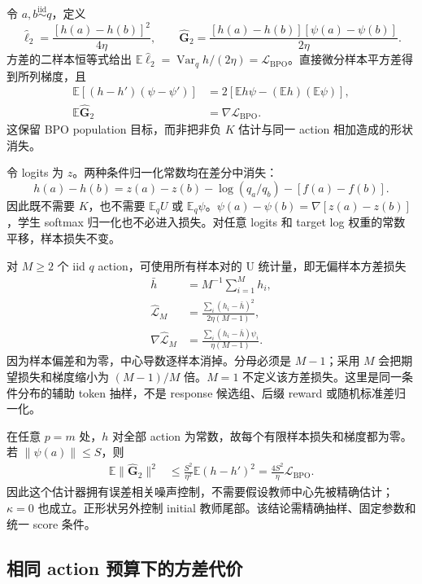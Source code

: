 \documentclass[lang=cn,scheme=chinese,openany]{../book/elegantbook}
\newcommand{\E}{\mathbb E}
\newcommand{\Var}{\operatorname{Var}}
\begin{document}
令 $a,b\overset{\mathrm{iid}}\sim q$，定义
\begin{equation}
 \widehat\ell_2=\frac{[h(a)-h(b)]^2}{4\eta},\qquad
 \widehat{\bm G}_2=\frac{[h(a)-h(b)][\psi(a)-\psi(b)]}{2\eta}.
 \label{eq:center-free-pair-bpo}
\end{equation}
方差的二样本恒等式给出 $\E\widehat\ell_2=\Var_qh/(2\eta)=\mathcal L_{\mathrm{BPO}}$。直接微分样本平方差得到所列梯度，且
\begin{align}
 \E[(h-h')(\psi-\psi')]&=2[\E h\psi-(\E h)(\E\psi)],\\
 \E\widehat{\bm G}_2&=\nabla\mathcal L_{\mathrm{BPO}}.
\end{align}
这保留 BPO population 目标，而非把非负 $K$ 估计与同一 action 相加造成的形状消失。

令 logits 为 $z$。两种条件归一化常数均在差分中消失：
\begin{equation}
 h(a)-h(b)=z(a)-z(b)-\log(q_a/q_b)-[f(a)-f(b)].
\end{equation}
因此既不需要 $K$，也不需要 $\E_qU$ 或 $\E_q\psi$。$\psi(a)-\psi(b)=\nabla[z(a)-z(b)]$，学生 softmax 归一化也不必进入损失。对任意 logits 和 target log 权重的常数平移，样本损失不变。

对 $M\ge2$ 个 iid $q$ action，可使用所有样本对的 U 统计量，即无偏样本方差损失
\begin{align}
 \bar h&=M^{-1}\sum_{i=1}^Mh_i,\\
 \widehat{\mathcal L}_M
 &=\frac{\sum_i(h_i-\bar h)^2}{2\eta(M-1)},\\
 \nabla\widehat{\mathcal L}_M
 &=\frac{\sum_i(h_i-\bar h)\psi_i}{\eta(M-1)}.
 \label{eq:center-free-sample-variance-bpo}
\end{align}
因为样本偏差和为零，中心导数逐样本消掉。分母必须是 $M-1$；采用 $M$ 会把期望损失和梯度缩小为 $(M-1)/M$ 倍。$M=1$ 不定义该方差损失。这里是同一条件分布的辅助 token 抽样，不是 response 候选组、后缀 reward 或随机标准差归一化。

在任意 $p=m$ 处，$h$ 对全部 action 为常数，故每个有限样本损失和梯度都为零。若 $\|\psi(a)\|\le S$，则
\begin{align}
 \E\|\widehat{\bm G}_2\|^2
 &\le\frac{S^2}{\eta^2}\E(h-h')^2
 =\frac{4S^2}{\eta}\mathcal L_{\mathrm{BPO}}.
\end{align}
因此这个估计器拥有误差相关噪声控制，不需要假设教师中心先被精确估计；$\kappa=0$ 也成立。正形状另外控制 initial 教师尾部。该结论需精确抽样、固定参数和统一 score 条件。
\subsection{相同 action 预算下的方差代价}
\end{document}

